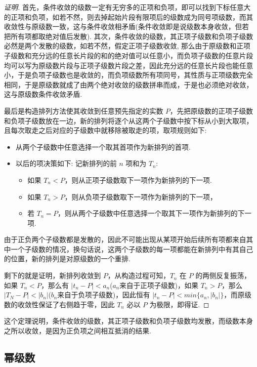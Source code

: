 \begin{proof}[证明]
 首先，条件收敛的级数一定有无穷多的正项和负项，即可以找到下标任意大的正项和负项，如若不然，则去掉起始片段有限项后的级数成为同号项级数，而其收敛性与原级数一致，这与条件收敛相矛盾(条件收敛即是说级数本身收敛，但若把所有项都取绝对值后发散).
 其次，条件收敛的级数，其正项子级数和负项子级数必然是两个发散的级数，如若不然，假定正项子级数收敛, 那么由于原级数和正项子级数和充分远的任意长片段的和的绝对值可以任意小，而负项子级数的任意片段均可以写为原级数片段与正项子级数片段之差，因此充分远的任意长片段也能任意小，于是负项子级数也是收敛的，而负项级数所有项同号，其性质与正项级数完全相同，于是原级数就成了由两个绝对收敛的级数拼串而成，于是也必须绝对收敛，这与原级数条件收敛矛盾.

 最后是构造排列方法使其收敛到任意预先指定的实数 $P$，先把原级数的正项子级数和负项子级数放在一边，新的排列将逐个从这两个子级数中按下标从小到大取项，且每次取走之后对应的子级数中就移除被取走的项，取项规则如下:
 \begin{itemize}
 \item 从两个子级数中任意选择一个取其首项作为新排列的首项.
 \item 以后的项决策如下: 记新排列的前 $n$ 项和为 $T_n$:
   \begin{itemize}
   \item 如果 $T_n<P$，则从正项子级数取下一项作为新排列的下一项.
   \item 如果 $T_n>P$，则从负项子级数取下一项作为新排列的下一项，
   \item 若 $T_n=P$，则从两个子级数中任意选择一个取其下一项作为新排列的下一项.
   \end{itemize}
 \end{itemize}
 由于正负两个子级数都是发散的，因此不可能出现从某项开始后续所有项都来自其中一个子级数的情况，换句话说，这两个子级数的每一项都能在新排列中有其自己的位置，新的排列是对原级数的一个重排.

 剩下的就是证明，新排列收敛到 $P$，从构造过程可知，$T_n$ 在 $P$ 的两侧反复振荡，如果 $T_n<P$，那么有 $|t_n-P|<a_n$($a_n$来自于正项子级数)，如果 $T_n>P$，那么 $|T_N-P|<|b_n|$($b_n$来自于负项子级数)，因此恒有 $|t_n-P|<min\{a_n,|b_n|\}$，而原级数的收敛性保证了右侧趋于零，因此 $T_n$ 必以 $P$ 为极限，即得证.
\end{proof}

这个定理说明，条件收敛的级数，其正项子级数和负项子级数均发散，而级数本身之所以收敛，是因为正负项之间相互抵消的结果.

\subsection{幂级数}
\label{sec:power-series}

